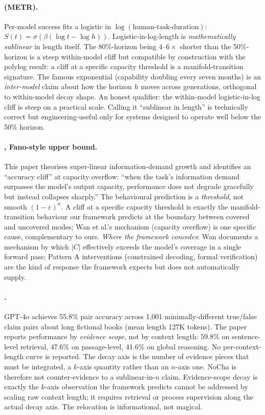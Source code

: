 \documentclass{article}
\theoremstyle{taeplain}
\theoremstyle{taedefn}
\begin{document}
\paragraph{\citet{kwa2025horizon} (METR).}
Per-model success fits a logistic in $\log(\text{human-task-duration})$: $S(t) = \sigma(\beta (\log t - \log h))$. Logistic-in-log-length is \emph{mathematically sublinear} in length itself. The 80\%-horizon being $4$--$6\times$ shorter than the 50\%-horizon is a steep within-model cliff but compatible by construction with the polylog result: a cliff at a specific capacity threshold is a manifold-transition signature. The famous exponential (capability doubling every seven months) is an \emph{inter-model} claim about how the horizon $h$ moves across generations, orthogonal to within-model decay shape. An honest qualifier: the within-model logistic-in-log cliff is steep on a practical scale. Calling it ``sublinear in length'' is technically correct but engineering-useful only for systems designed to operate well below the 50\% horizon.

\paragraph{\citet{wan2026fano}, Fano-style upper bound.}
This paper theorises super-linear information-demand growth and identifies an ``accuracy cliff'' at capacity overflow: ``when the task's information demand surpasses the model's output capacity, performance does not degrade gracefully but instead collapses sharply.'' The behavioural prediction is a \emph{threshold}, not smooth $(1-\varepsilon)^n$. A cliff at a specific capacity threshold is exactly the manifold-transition behaviour our framework predicts at the boundary between covered and uncovered modes; Wan et al.'s mechanism (capacity overflow) is one specific cause, complementary to ours. \emph{Where the framework concedes}: Wan documents a mechanism by which $|C|$ effectively exceeds the model's coverage in a single forward pass; Pattern A interventions (constrained decoding, formal verification) are the kind of response the framework expects but does not automatically supply.

\paragraph{\citet{karpinska2024nocha}.}
GPT-4o achieves 55.8\% pair accuracy across 1,001 minimally-different true/false claim pairs about long fictional books (mean length 127K tokens). The paper reports performance by \emph{evidence scope}, not by context length: 59.8\% on sentence-level retrieval, 47.6\% on passage-level, 41.6\% on global reasoning. No per-context-length curve is reported. The decay axis is the number of evidence pieces that must be integrated, a $k$-axis quantity rather than an $n$-axis one. NoCha is therefore not counter-evidence to a sublinear-in-$n$ claim. Evidence-scope decay is exactly the $k$-axis observation the framework predicts cannot be addressed by scaling raw context length; it requires retrieval or process supervision along the actual decay axis. The relocation is informational, not magical.
\end{document}
